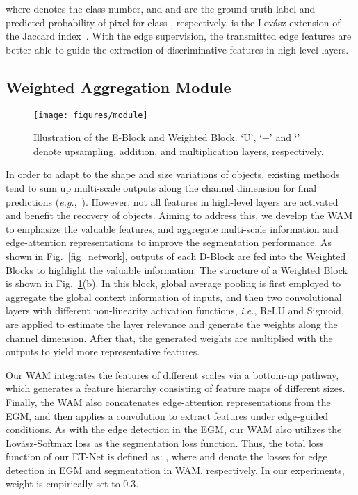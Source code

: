 \documentclass[runningheads,a4paper]{llncs}
\newcommand{\ie}{{\it i.e.}}
\begin{document}
where  denotes the class number, and  and  are the ground truth label and predicted probability of pixel   for class , respectively.  is the Lov\'{a}sz extension of the Jaccard index~\cite{Berman_2018_CVPR}. With the edge supervision, the transmitted edge features are better able to guide the extraction of discriminative features in high-level layers.

\subsection{Weighted Aggregation Module}
\label{sec:method:WAM}

\begin{figure}[!t]
	\centering
	\texttt{[image: figures/module]}
	\caption{Illustration of the E-Block and Weighted Block. `U', `+' and `' denote upsampling, addition, and multiplication layers, respectively.}
	\label{fig:module}
\end{figure}

In order to adapt to the shape and size variations of objects, existing methods tend to sum up multi-scale outputs along the channel dimension for final predictions (\textit{e.g.},~\cite{mnet2018fu,shen2019}). However, not all features in high-level layers are activated and benefit the recovery of objects. Aiming to address this, we develop the WAM to emphasize the valuable features, and aggregate multi-scale information and edge-attention representations to improve the segmentation performance.
As shown in Fig.~\ref{fig_network}, outputs of each D-Block are fed into the Weighted Blocks to highlight the valuable information.
The structure of a Weighted Block is shown in Fig.~\ref{fig:module}(b). In this block, global average pooling is first employed to aggregate the global context information of inputs, and then two  convolutional layers with different non-linearity activation functions, \ie, ReLU and Sigmoid, are applied to estimate the layer relevance and generate the weights along the channel dimension. After that, the generated weights are multiplied with the outputs to yield more representative features.

Our WAM integrates the features of different scales via a bottom-up pathway, which generates a feature hierarchy consisting of feature maps of different sizes. Finally, the WAM also concatenates edge-attention representations from the EGM, and then applies a  convolution to extract features under edge-guided conditions. As with the edge detection in the EGM, our WAM also utilizes the Lov\'{a}sz-Softmax loss as the segmentation loss function. Thus, the total loss function of our ET-Net is defined as: ,
where  and  denote the losses for edge detection in EGM and segmentation in WAM, respectively. In our experiments, weight  is empirically set to 0.3.
\end{document}
